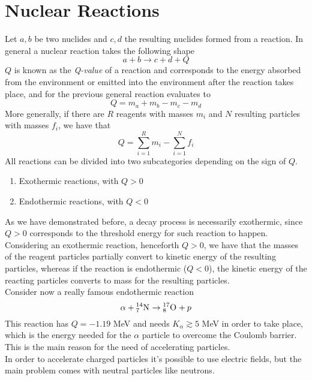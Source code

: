 \documentclass[../qm.tex]{subfiles}
\begin{document}
\section{Nuclear Reactions}
Let $a,b$ be two nuclides and $c,d$ the resulting nuclides formed from a reaction. In general a nuclear reaction takes the following shape
\begin{equation}
	a+b\to c+d+Q
	\label{eq:nucrec}
\end{equation}
$Q$ is known as the \emph{Q-value} of a reaction and corresponds to the energy absorbed from the environment or emitted into the environment after the reaction takes place, and for the previous general reaction evaluates to
\begin{equation*}
	Q=m_a+m_b-m_c-m_d
\end{equation*}
More generally, if there are $R$ reagents with masses $m_i$ and $N$ resulting particles with masses $f_i$, we have that
\begin{equation}
	Q=\sum_{i=1}^Rm_i-\sum_{i=1}^Nf_i
	\label{eq:qvalue}
\end{equation}
All reactions can be divided into two subcategories depending on the sign of $Q$.
\begin{enumerate}
\item Exothermic reactions, with $Q>0$
\item Endothermic reactions, with $Q<0$
\end{enumerate}
As we have demonstrated before, a decay process is necessarily exothermic, since $Q>0$ corresponds to the threshold energy for such reaction to happen.\\
Considering an exothermic reaction, henceforth $Q>0$, we have that the masses of the reagent particles partially convert to kinetic energy of the resulting particles, whereas if the reaction is endothermic ($Q<0$), the kinetic energy of the reacting particles converts to mass for the resulting particles.\\
Consider now a really famous endothermic reaction
\begin{equation*}
	\alpha+\nuc{N}{14}{7}\to\nuc{O}{17}{8}+p
\end{equation*}
This reaction has $Q=-1.19$ MeV and needs $K_\alpha\gtrsim5$ MeV in order to take place, which is the energy needed for the $\alpha$ particle to overcome the Coulomb barrier. This is the main reason for the need of accelerating particles.\\
In order to accelerate charged particles it's possible to use electric fields, but the main problem comes with neutral particles like neutrons.\\
\end{document}
